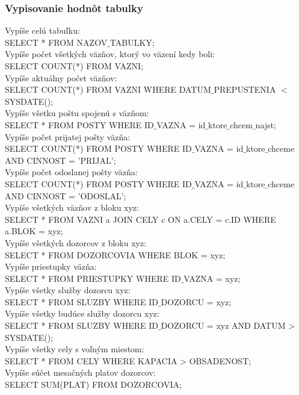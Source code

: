 \documentclass[slovak, 12pt, Times New Roman]{article}
\begin{document}
			\subsubsection{Vypisovanie hodnôt tabulky}
				Vypíše celú tabuľku:\\
				SELECT * FROM NAZOV$\_$TABULKY;\\
				Vypíše počet všetkých väzňov, ktorý vo väzení kedy boli:\\
				SELECT COUNT(*) FROM VAZNI;\\
				Vypíše aktuálny počet väzňov:\\
				SELECT COUNT(*) FROM VAZNI WHERE DATUM$\_$PREPUSTENIA $<$ SYSDATE();\\
				Vypíše všetku poštu spojenú s väzňom:\\
				SELECT * FROM POSTY WHERE ID$\_$VAZNA = id$\_$ktore$\_$chcem$\_$najst;\\
				Vypíše počet prijatej pošty väzňa:\\
				SELECT COUNT(*) FROM POSTY WHERE ID$\_$VAZNA = id$\_$ktore$\_$chceme AND CINNOST = 'PRIJAL';\\
				Vypíše počet odoslanej pošty väzňa:\\
				SELECT COUNT(*) FROM POSTY WHERE ID$\_$VAZNA = id$\_$ktore$\_$chceme AND CINNOST = 'ODOSLAL';\\
				Vypíše všetkých väzňov z bloku xyz:\\
				SELECT * FROM VAZNI a JOIN CELY c ON a.CELY = c.ID WHERE a.BLOK = xyz;\\
				Vypíše všetkých dozorcov z bloku xyz:\\
				SELECT * FROM DOZORCOVIA WHERE BLOK = xyz;\\
				Vypíše priestupky väzňa:\\
				SELECT * FROM PRIESTUPKY WHERE ID$\_$VAZNA = xyz;\\
				Vypíše všetky služby dozorcu xyz:\\
				SELECT * FROM SLUZBY WHERE ID$\_$DOZORCU = xyz;\\
				Vypíše všetky budúce služby dozorcu xyz:\\
				SELECT * FROM SLUZBY WHERE ID$\_$DOZORCU = xyz AND DATUM > SYSDATE();\\
				Vypíše všetky cely s voľným miestom:\\
				SELECT * FROM CELY WHERE KAPACIA > OBSADENOST;\\
				Vypíše súčet mesačných platov dozorcov:\\
				SELECT SUM(PLAT) FROM DOZORCOVIA;\\
\end{document}
